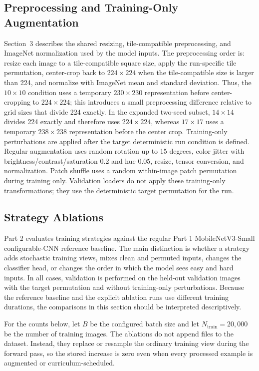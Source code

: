 \documentclass[12pt]{article}
\begin{document}
\subsection{Preprocessing and Training-Only Augmentation}

Section~3 describes the shared resizing, tile-compatible preprocessing, and ImageNet normalization used by the model inputs. The preprocessing order is: resize each image to a tile-compatible square size, apply the run-specific tile permutation, center-crop back to $224 \times 224$ when the tile-compatible size is larger than 224, and normalize with ImageNet mean and standard deviation. Thus, the $10 \times 10$ condition uses a temporary $230 \times 230$ representation before center-cropping to $224 \times 224$; this introduces a small preprocessing difference relative to grid sizes that divide 224 exactly. In the expanded two-seed subset, $14 \times 14$ divides 224 exactly and therefore uses $224 \times 224$, whereas $17 \times 17$ uses a temporary $238 \times 238$ representation before the center crop. Training-only perturbations are applied after the target deterministic run condition is defined. Regular augmentation uses random rotation up to 15 degrees, color jitter with brightness/contrast/saturation 0.2 and hue 0.05, resize, tensor conversion, and normalization. Patch shuffle uses a random within-image patch permutation during training only. Validation loaders do not apply these training-only transformations; they use the deterministic target permutation for the run.

\subsection{Strategy Ablations}

Part 2 evaluates training strategies against the regular Part 1 MobileNetV3-Small configurable-CNN reference baseline. The main distinction is whether a strategy adds stochastic training views, mixes clean and permuted inputs, changes the classifier head, or changes the order in which the model sees easy and hard inputs. In all cases, validation is performed on the held-out validation images with the target permutation and without training-only perturbations. Because the reference baseline and the explicit ablation runs use different training durations, the comparisons in this section should be interpreted descriptively.

For the counts below, let $B$ be the configured batch size and let $N_{\mathrm{train}}=20{,}000$ be the number of training images. The ablations do not append files to the dataset. Instead, they replace or resample the ordinary training view during the forward pass, so the stored increase is zero even when every processed example is augmented or curriculum-scheduled.
\end{document}

